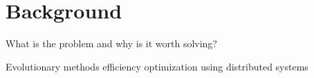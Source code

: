 \chapter{Background}
{\huge What is the problem and why is it worth solving?}


{\huge Evolutionary methods efficiency optimization using distributed systems}